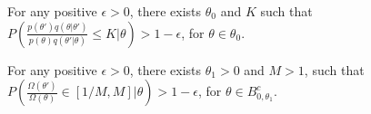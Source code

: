 \begin{assumption}
For any positive $\epsilon > 0$, there exists $\theta_0$ and $K$ 
such that $P(\frac{p(\theta')q(\theta|\theta')}{p(\theta)q(\theta'|\theta)} \le K | \theta) > 1 - \epsilon$, 
for $\theta \in \theta_0$. 
  \label{asmp:prior}
\end{assumption}



\begin{assumption}
For any positive $\epsilon > 0$, there exists $\theta_1 > 0$ and $M > 1$, such that $P(\frac{\Omega(\theta')}{\Omega(\theta)} \in [1/M, M] | \theta) > 1 - \epsilon$, for $\theta \in B_{0, \theta_1}^c$. 
  \label{asmp:omega}
\end{assumption}

